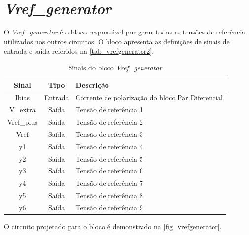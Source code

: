 \renewcommand{\NomeBloco}{\emph{Vref\_generator}}
\renewcommand{\NomeBlocoNoUnderline}{vrefgenerator}
\renewcommand{\NomePTab}{tab_\NomeBlocoNoUnderline}
\renewcommand{\NomeSTab}{tab_\NomeBlocoNoUnderline2}
\renewcommand{\NomePFig}{fig_\NomeBlocoNoUnderline}
\renewcommand{\NomeSFig}{fig_\NomeBlocoNoUnderline2}
\renewcommand{\NomeTTab}{tab_\NomeBlocoNoUnderline3}
\renewcommand{\NomeQTab}{tab_\NomeBlocoNoUnderline4}

\section{\NomeBloco}

O \emph{\NomeBloco} \'e o bloco respons\'avel por gerar todas as tens\~oes de refer\^encia utilizados nos outros circuitos. O bloco apresenta as defini{\c c}\~oes de sinais de entrada e sa\'ida referidos na \autoref{\NomeSTab}.

\begin{table}[htbp]
\caption{Sinais do bloco \NomeBloco}
\label{\NomeSTab}
\centering
\begin{tabular}{ccl}

    \toprule
    Sinal & Tipo    & Descri{\c c}\~ao      \\
    \midrule \midrule
    Ibias   & Entrada   & Corrente de polariza{\c c}\~ao do bloco Par Diferencial \\
    \midrule
    V\_extra   & Saída   & Tens\~ao de refer\^encia 1 \\
    \midrule
    Vref\_plus   & Saída   & Tens\~ao de refer\^encia 2 \\
    \midrule
    Vref   & Saída   & Tens\~ao de refer\^encia 3 \\
    \midrule
    y1   & Saída   & Tens\~ao de refer\^encia 4 \\
    \midrule
    y2   & Saída   & Tens\~ao de refer\^encia 5 \\
    \midrule
    y3   & Saída   & Tens\~ao de refer\^encia 6 \\
    \midrule
    y4  & Saída   & Tens\~ao de refer\^encia 7 \\
    \midrule
    y5   & Saída   & Tens\~ao de refer\^encia 8 \\
    \midrule
    y6   & Saída   & Tens\~ao de refer\^encia 9 \\
    \bottomrule
\end{tabular}
\end{table}

O circuito projetado para o bloco \'e demonstrado na \autoref{\NomePFig}.


